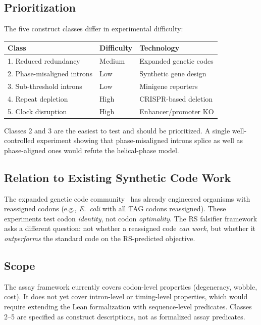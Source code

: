 \documentclass[11pt,twocolumn]{article}
\begin{document}
\subsection{Prioritization}

The five construct classes differ in experimental difficulty:

\begin{center}
\small
\begin{tabular}{@{}lll@{}}
\toprule
Class & Difficulty & Technology \\
\midrule
1. Reduced redundancy & Medium & Expanded genetic codes \\
2. Phase-misaligned introns & Low & Synthetic gene design \\
3. Sub-threshold introns & Low & Minigene reporters \\
4. Repeat depletion & High & CRISPR-based deletion \\
5. Clock disruption & High & Enhancer/promoter KO \\
\bottomrule
\end{tabular}
\end{center}

Classes 2 and 3 are the easiest to test and should be prioritized. A
single well-controlled experiment showing that phase-misaligned introns
splice as well as phase-aligned ones would refute the helical-phase model.

\subsection{Relation to Existing Synthetic Code Work}

The expanded genetic code community~\cite{Chin2017} has already
engineered organisms with reassigned codons (e.g., \emph{E.~coli} with
all TAG codons reassigned). These experiments test codon \emph{identity},
not codon \emph{optimality}. The RS falsifier framework asks a different
question: not whether a reassigned code \emph{can work}, but whether it
\emph{outperforms} the standard code on the RS-predicted objective.

\subsection{Scope}

The assay framework currently covers codon-level properties (degeneracy,
wobble, cost). It does not yet cover intron-level or timing-level
properties, which would require extending the Lean formalization with
sequence-level predicates. Classes 2--5 are specified as construct
descriptions, not as formalized assay predicates.
\end{document}
